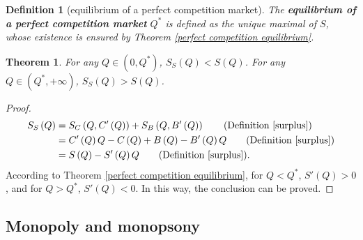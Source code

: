 \documentclass{article}
\newtheorem{theorem}{Theorem}
\newtheorem{definition}{Definition}
\begin{document}
\begin{definition}[equilibrium of a perfect competition market]
\label{def perfect competition equilibrium}
The \textbf{equilibrium of a perfect competition market} $Q^*$ is defined as the unique maximal of $S$, whose existence is ensured by Theorem \ref{perfect competition equilibrium}.
\end{definition}

\begin{theorem}
\label{difference in social and actual social}
For any $Q\in\left(0,Q^*\right)$, $S_S\left(Q\right)<S\left(Q\right)$.
For any $Q\in\left(Q^*,+\infty\right)$, $S_S\left(Q\right)>S\left(Q\right)$.
\end{theorem}
\begin{proof}
\begin{align*}
S_S\left(Q\right)&=S_C\left(Q,C'\left(Q\right)\right)+S_B\left(Q,B'\left(Q\right)\right)\qquad\text{(Definition \ref{surplus})}\\
&=C'\left(Q\right)Q-C\left(Q\right)+B\left(Q\right)-B'\left(Q\right)Q\qquad\text{(Definition \ref{surplus})}\\
&=S\left(Q\right)-S'\left(Q\right)Q\qquad\text{(Definition \ref{surplus})}.
\end{align*}
According to Theorem \ref{perfect competition equilibrium},
for $Q<Q^*$, $S'\left(Q\right)>0$, and for $Q>Q^*$, $S'\left(Q\right)<0$.
In this way, the conclusion can be proved.
\end{proof}

\subsection{Monopoly and monopsony}
\end{document}
